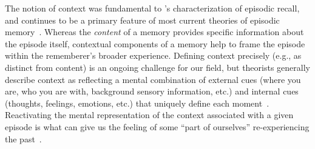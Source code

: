 \documentclass{article}
\begin{document}
The notion of context was fundamental to \citeauthor{Tulv83}'s characterization of episodic recall, and continues to be a primary feature of most current theories of episodic memory~\citep[e.g., for review see][]{Kaha12}.  Whereas the \textit{content} of a memory provides specific information about the episode itself, contextual components of a memory help to frame the episode within the rememberer's broader experience.  Defining context precisely (e.g., as distinct from content) is an ongoing challenge for our field, but theorists generally describe context as reflecting a mental combination of external cues (where you are, who you are with, background sensory information, etc.) and internal cues (thoughts, feelings, emotions, etc.) that uniquely define each moment~\citep[e.g., see review by][]{MannEtal15}.  Reactivating the mental representation of the context associated with a given episode is what can give us the feeling of some ``part of ourselves'' re-experiencing the past~\citep[Tulving refers to this feeling as \textit{autonoetic awareness};][]{Tulv02a}.
\end{document}
